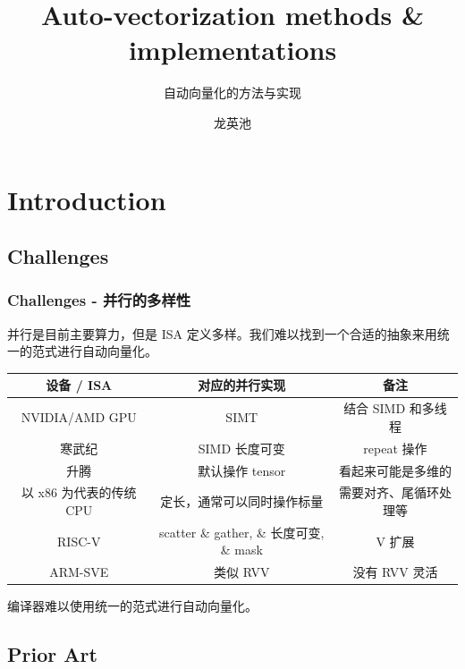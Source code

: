 \documentclass[aspectratio=169]{ctexbeamer}
\title{Auto-vectorization methods \& implementations}
\subtitle{自动向量化的方法与实现}
\author{龙英池}
\institute{Interns @ ISCAS}
\begin{document}
\maketitle
\section{Introduction}
\subsection{Challenges}
\begin{frame}
    \frametitle{Challenges - 并行的多样性}

    并行是目前主要算力，但是 ISA 定义多样。我们难以找到一个合适的抽象来用统一的范式进行自动向量化。

    \begin{table}
        \centering
        \begin{tabular}{ccc}
            \toprule
            设备 / ISA         & 对应的并行实现                             & 备注           \\
            \midrule
            NVIDIA/AMD GPU   & SIMT                                & 结合 SIMD 和多线程 \\
            寒武纪              & SIMD 长度可变                           & repeat 操作    \\
            升腾               & 默认操作 tensor                         & 看起来可能是多维的    \\
            以 x86 为代表的传统 CPU & 定长，通常可以同时操作标量                       & 需要对齐、尾循环处理等  \\
            RISC-V           & scatter \& gather, \& 长度可变, \& mask & V 扩展         \\
            ARM-SVE          & 类似 RVV                              & 没有 RVV 灵活    \\
            \bottomrule
        \end{tabular}
    \end{table}

    编译器难以使用统一的范式进行自动向量化。

\end{frame}

\subsection{Prior Art}
\end{document}
